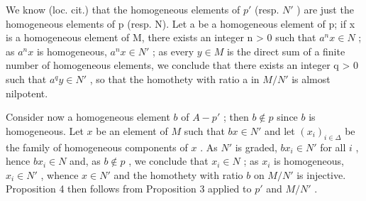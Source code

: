 We know (loc. cit.) that the homogeneous elements of \(p'\) (resp. \(N'\) ) are just the homogeneous elements of p (resp. N). Let a be a homogeneous element of p; if x is a homogeneous element of M, there exists an integer n \textgreater{} 0 such that \(a^{n}x \in N\) ; as \(a^{n}x\) is homogeneous, \(a^{n}x \in N'\) ; as every \(y \in M\) is the direct sum of a finite number of homogeneous elements, we conclude that there exists an integer q \textgreater{} 0 such that \(a^{q}y \in N'\) , so that the homothety with ratio a in \(M/N'\) is almost nilpotent.

Consider now a homogeneous element \(b\) of \(A - p'\) ; then \(b \notin p\) since \(b\) is homogeneous. Let \(x\) be an element of \(M\) such that \(bx \in N'\) and let \((x_i)_{i \in \Delta}\) be the family of homogeneous components of \(x\) . As \(N'\) is graded, \(bx_i \in N'\) for all \(i\) , hence \(bx_i \in N\) and, as \(b \notin p\) , we conclude that \(x_i \in N\) ; as \(x_i\) is homogeneous, \(x_i \in N'\) , whence \(x \in N'\) and the homothety with ratio \(b\) on \(M/N'\) is injective. Proposition 4 then follows from Proposition 3 applied to \(p'\) and \(M/N'\) .

